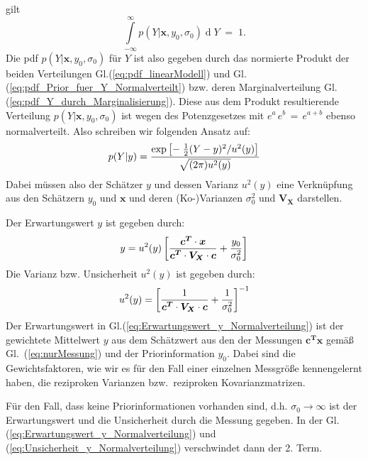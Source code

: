 gilt
$$
\int\limits_{-\infty}^{\infty} p(Y | \boldsymbol{x}, y_0, \sigma_0) 
\operatorname{d}Y \; = \; 1 .
$$
Die pdf $p(Y | \boldsymbol{x}, y_0, \sigma_0)$ für $Y$ ist also gegeben durch das normierte 
Produkt der beiden Verteilungen Gl.(\ref{eq:pdf_linearModell}) und 
Gl.(\ref{eq:pdf_Prior_fuer_Y_Normalverteilt})
bzw. deren Marginalverteilung Gl.(\ref{eq:pdf_Y_durch_Marginalisierung}).
Diese aus dem Produkt resultierende Verteilung $p(Y | \boldsymbol{x}, y_0, \sigma_0)$ ist 
wegen des Potenzgesetzes mit $e^a \, e^b \, = \, e^{a+b}$ ebenso normalverteilt. Also
schreiben wir folgenden Ansatz auf:
\begin{equation}
p(Y| y) =  \frac{\textstyle \exp \left[- \; \frac{1}{2} (Y - y)^2/u^2(y) \right]}{\textstyle \sqrt{(2 \pi) u^2(y)}}
\end{equation}
Dabei müssen also der Schätzer $y$ und dessen Varianz $u^2(y)$ eine Verknüpfung aus
den Schätzern $y_0$ und $\boldsymbol{x}$ und deren (Ko-)Varianzen $\sigma_0^2$ und
$\boldsymbol{V_X}$ darstellen.

Der Erwartungswert $y$ ist gegeben durch: 
\begin{equation}
y = u^2(y) \left[\frac{\textstyle \boldsymbol{c^T} \cdot \boldsymbol{x}}
{\textstyle \boldsymbol{c^T}\cdot\boldsymbol{V_X} \cdot \boldsymbol{c}} + 
\frac{\textstyle y_0}{\textstyle \sigma_0^2} \right]
\label{eq:Erwartungswert_y_Normalverteilung}
\end{equation}
Die Varianz bzw. Unsicherheit $u^2(y)$ ist gegeben durch:
\begin{equation}
u^2(y) =  \left[\frac{1}
{\textstyle \boldsymbol{c^T}\cdot\boldsymbol{V_X} \cdot \boldsymbol{c}} + 
\frac{\textstyle 1}{\textstyle \sigma_0^2} \right]^{-1}
\label{eq:Unsicherheit_y_Normalverteilung}
\end{equation}
Der Erwartungswert in Gl.(\ref{eq:Erwartungswert_y_Normalverteilung})
ist der gewichtete Mittelwert $y$ aus dem Schätzwert aus den
der Messungen $\boldsymbol{c^T}\boldsymbol{x}$ gemäß Gl.~(\ref{eq:nurMessung}) und
der Priorinformation $y_0$. Dabei sind die Gewichtsfaktoren, wie wir es
für den Fall einer einzelnen Messgröße kennengelernt haben, die reziproken
Varianzen bzw.\ reziproken Kovarianzmatrizen.

Für den Fall, dass keine Priorinformationen vorhanden sind, d.h. 
$\sigma_0 \rightarrow \infty$ ist der Erwartungswert und die Unsicherheit durch die Messung gegeben.
In der Gl. (\ref{eq:Erwartungswert_y_Normalverteilung}) und (\ref{eq:Unsicherheit_y_Normalverteilung}) verschwindet dann der 2. Term.


